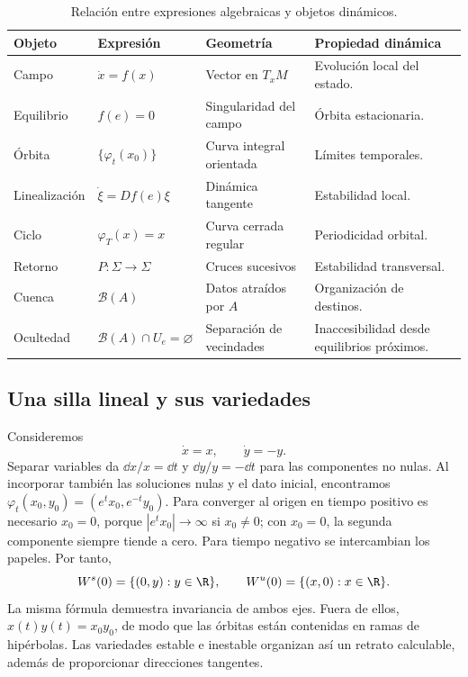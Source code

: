 \begin{table}[H]
\centering
\caption{Relación entre expresiones algebraicas y objetos dinámicos.}
\label{tab:diccionario-algebra-geometria}
\small
\begin{tabularx}{\textwidth}{@{}L{2.4cm}YYY@{}}
\toprule
Objeto & Expresión & Geometría & Propiedad dinámica \\
\midrule
Campo & $\dot x=f(x)$ & Vector en $T_xM$ & Evolución local del estado. \\
Equilibrio & $f(e)=0$ & Singularidad del campo & Órbita estacionaria. \\
Órbita & $\{\varphi_t(x_0)\}$ & Curva integral orientada & Límites temporales. \\
Linealización & $\dot\xi=Df(e)\xi$ & Dinámica tangente & Estabilidad local. \\
Ciclo & $\varphi_T(x)=x$ & Curva cerrada regular & Periodicidad orbital. \\
Retorno & $P:\Sigma\to\Sigma$ & Cruces sucesivos & Estabilidad transversal. \\
Cuenca & $\mathcal B(A)$ & Datos atraídos por $A$ & Organización de destinos. \\
Ocultedad & $\mathcal B(A)\cap U_e=\varnothing$ & Separación de vecindades &
Inaccesibilidad desde equilibrios próximos. \\
\bottomrule
\end{tabularx}
\end{table}

\subsection{Una silla lineal y sus variedades}

Consideremos
\begin{equation}
 \dot x=x,\qquad \dot y=-y.
 \label{eq:guide-linear-saddle}
\end{equation}
Separar variables da \(\dd x/x=\dd t\) y \(\dd y/y=-\dd t\) para las
componentes no nulas. Al incorporar también las soluciones nulas y el dato
inicial, encontramos
\(\varphi_t(x_0,y_0)=(e^tx_0,e^{-t}y_0)\). Para converger al origen en
tiempo positivo es necesario \(x_0=0\), porque \(|e^tx_0|\to\infty\)
si \(x_0\ne0\); con \(x_0=0\), la segunda componente siempre tiende a
cero. Para tiempo negativo se intercambian los papeles. Por tanto,
\[
 W^s(0)=\{(0,y):y\in\R\},\qquad
 W^u(0)=\{(x,0):x\in\R\}.
\]
La misma fórmula demuestra invariancia de ambos ejes. Fuera de ellos,
\(x(t)y(t)=x_0y_0\), de modo que las órbitas están contenidas en ramas de
hipérbolas. Las variedades estable e inestable organizan así un retrato
calculable, además de proporcionar direcciones tangentes.

